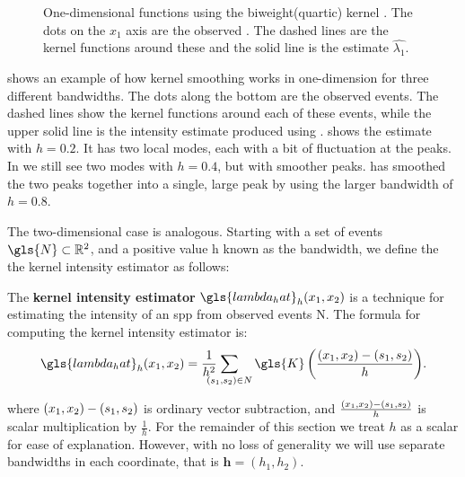 \begin{figure}[H]
\begin{subfigure}[t]{0.32\textwidth}
        \label{fig:theory:kernel1d:08}
    \end{subfigure}
    \caption[One-dimensional  functions]
        {One-dimensional  functions using the biweight(quartic) kernel \citep{silverman1986density}.
        The dots on the $x_1$ axis are the observed .
        The dashed lines are the kernel functions around these 
        and the solid line is the  estimate $\hat{\lambda_1}$.}
    \label{fig:theory:kernel1d}
\end{figure}

 shows an example of how \gls{kernel} smoothing works in  one-dimension for three different bandwidths.
The dots along the bottom are the observed \glspl{event}.
The dashed lines show the \gls{kernel} functions around each of these \glspl{event},
while the upper solid line is the \gls{intensity} estimate produced using .
 shows the estimate with $h=0.2$.
It has two local modes, each with a bit of fluctuation at the peaks.
In  we still see two modes with $h=0.4$, but with smoother peaks.
 has smoothed the two peaks together into a single,
large peak by using the larger bandwidth of $h=0.8$.

The two-dimensional case is analogous.
Starting with a set of \glspl{event} $\gls{N} \subset \RS$,
and a positive value \gls{h} known as the bandwidth,
we define the the \gls{kernel intensity estimator} as follows:
\begin{defn}
    \label{defn:lambda_hat}
    The \textbf{\gls{kernel intensity estimator}} $\gls{lambda_hat}_h \xvec$
    is a technique for estimating the \gls{intensity} of an \gls{spp}
    from observed \glspl{event} \gls{N}.
    The formula for computing the \gls{kernel intensity estimator} is:
    \begin{equation}
        \label{eq:lambda_hat}
        \gls{lambda_hat}_h \xvec%
            = \sumS{\gls{K}\left( \frac{\xvec-(s_1, s_2)}{h} \right)} \text{.}%
    \end{equation}
\end{defn}
where $(x_1, x_2)-(s_1, s_2)$ is ordinary vector subtraction,
and $\frac{(x_1, x_2)-(s_1, s_2)}{h}$ is scalar multiplication by $\frac{1}{h}$.
For the remainder of this section we treat $h$ as a scalar for ease of explanation.
However, with no loss of generality we will use separate bandwidths in each coordinate,
that is $\mathbf{h}=(h_1, h_2)$.

